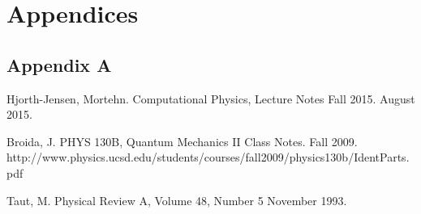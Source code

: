 \documentclass[%
oneside,                 %
final,                   %
10pt]{article}
\begin{document}
\section{Appendices}

\subsection{Appendix A} \label{A}



\begin{comment}

\begin{figure}[H]\label{fig:compzoom}
  \centering
    \texttt{[image: compzoom.eps]}
    \caption{A zoomed in view of the convergence to the exact solution}
\end{figure}

\begin{center} 
\begin{tabular}{ |c|c|c|c| }
\hline
Size of Matrix ($10^n$) & General & Tailored & LU \\
\hline
1& 3.00 E -6 & 3.00 E -6 & 2.40 E -5\\ 
2 & 4.00 E -6 & 4.00 E -6 & 1.71 E -3 \\ 
3 & 3.90 E -5 & 1.90 E -5 & 1.93\\ 
4 & 3.79 E -4 & 2.09 E -4 & N/A\\ 
5 & 3.38 E -3 & 1.51 E -3  & N/A\\ 
6 & 2.87 E -2 & 1.53 E -2 & N/A\\ 
7 & 3.16 E -1 & 1.73 E -1& N/A\\ 
\hline
\end{tabular}
\label{table:test}
\end{center}

\end{comment}

\begin{thebibliography}{9}

Hjorth-Jensen, Mortehn. 
Computational Physics, Lecture Notes Fall 2015. 
August 2015.


Broida, J.
PHYS 130B, Quantum Mechanics II Class Notes.
Fall 2009.
http://www.physics.ucsd.edu/students/courses/fall2009/physics130b/IdentParts.pdf

Taut, M.
Physical Review A, Volume 48, Number 5
November 1993.

\end{thebibliography}



\end{document}
